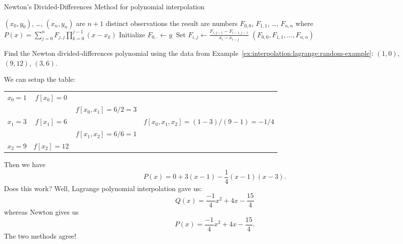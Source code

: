 \begin{algorithm}\label{alg:divided-diff:newton}
  \caption{Newton's Divided-Differences Method for polynomial interpolation}
  \begin{algorithmic}[1]
    \Require $(x_{0},y_{0})$, \dots, $(x_{n},y_{n})$ are $n+1$ distinct observations
    \Ensure the result are numbers $F_{0,0}$, $F_{1,1}$, \dots,
    $F_{n,n}$ where $P(x) = \sum_{j=0}^{n} F_{j,j}\prod^{j-1}_{k=0}(x-x_{k})$
    \State Initialize $F_{0,\cdot} \gets y_{\cdot}$
        \State Set $F_{i,j}\gets\frac{F_{i,j-1} - F_{i-1,j-1}}{x_{i}-x_{i-j}}$
      \EndFor
    \EndFor
    \State\Return $(F_{0,0}, F_{1,1}, \dots, F_{n,n})$
    \EndFunction
  \end{algorithmic}
\end{algorithm}

\begin{ex}
  Find the Newton divided-differences polynomial using the data from Example~\ref{ex:interpolation:lagrange:random-example}: $(1,0)$,
  $(9,12)$, $(3,6)$.

  We can setup the table:
  \begin{center}
    \begin{tabular}{c|ccc}
      $x_{0}=1$ & $f[x_{0}]=0$  &                 & \\
                &              & $f[x_{0},x_{1}]=6/2=3$ & \\
      $x_{1}=3$  & $f[x_{1}]=6$ &      & $f[x_{0},x_{1},x_{2}]=(1-3)/(9-1)=-1/4$\\
                &              & $f[x_{1},x_{2}]=6/6=1$ & \\
      $x_{2}=9$ & $f[x_{2}]=12$  &                 & 
    \end{tabular}
  \end{center}
  Then we have
  \begin{equation}
    P(x) = 0 + 3(x - 1) - \frac{1}{4}(x - 1)(x - 3).
  \end{equation}
  Does this work? Well, Lagrange polynomial interpolation gave us:
  \begin{equation}
    Q(x) = \frac{-1}{4}x^{2} + 4x - \frac{15}{4}
  \end{equation}
  whereas Newton gives us
  \begin{equation}
    P(x) %
    = \frac{-1}{4}x^{2} + 4x - \frac{15}{4}.
  \end{equation}
  The two methods agree!
\end{ex}

